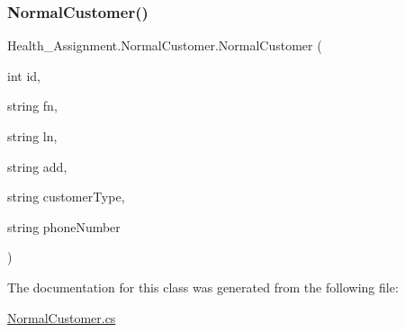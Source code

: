\mbox{\label{class_health___assignment_1_1_normal_customer_acc83b438b258b6d3f840875445d42ac3}} 
\subsubsection{\texorpdfstring{Normal\+Customer()}{NormalCustomer()}\hspace{0.1cm}{\footnotesize\ttfamily [3/3]}}
{\footnotesize\ttfamily Health\+\_\+\+Assignment.\+Normal\+Customer.\+Normal\+Customer (\begin{DoxyParamCaption}\item[{int}]{id,  }\item[{string}]{fn,  }\item[{string}]{ln,  }\item[{string}]{add,  }\item[{string}]{customer\+Type,  }\item[{string}]{phone\+Number }\end{DoxyParamCaption})\hspace{0.3cm}{\ttfamily [inline]}}



The documentation for this class was generated from the following file\+:\begin{DoxyCompactItemize}
\item 
\hyperlink{_normal_customer_8cs}{Normal\+Customer.\+cs}\end{DoxyCompactItemize}
